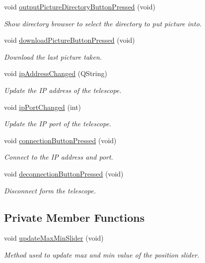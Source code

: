 \begin{DoxyCompactItemize}
void \mbox{\hyperlink{class_autoscope_window_form_a429d5bdc1f4d7d673e5ae85692e2b67f}{output\+Picture\+Directory\+Button\+Pressed}} (void)
\begin{DoxyCompactList}\small\item\em Show directory browser to select the directory to put picture into. \end{DoxyCompactList}\item 
void \mbox{\hyperlink{class_autoscope_window_form_aa9b74f8e713325bc6a1ffbfa2bde4c86}{download\+Picture\+Button\+Pressed}} (void)
\begin{DoxyCompactList}\small\item\em Download the last picture taken. \end{DoxyCompactList}\item 
void \mbox{\hyperlink{class_autoscope_window_form_a80f7209d6d50544e0ff3428929144ab9}{ip\+Address\+Changed}} (Q\+String)
\begin{DoxyCompactList}\small\item\em Update the IP address of the telescope. \end{DoxyCompactList}\item 
void \mbox{\hyperlink{class_autoscope_window_form_a6a97495bdd5b32ffb89c8c282873e214}{ip\+Port\+Changed}} (int)
\begin{DoxyCompactList}\small\item\em Update the IP port of the telescope. \end{DoxyCompactList}\item 
void \mbox{\hyperlink{class_autoscope_window_form_a1ff4464df3990dc363cb186813427a0d}{connection\+Button\+Pressed}} (void)
\begin{DoxyCompactList}\small\item\em Connect to the IP address and port. \end{DoxyCompactList}\item 
void \mbox{\hyperlink{class_autoscope_window_form_ab370615515fd07540aed9fa2afa06522}{deconnection\+Button\+Pressed}} (void)
\begin{DoxyCompactList}\small\item\em Disconnect form the telescope. \end{DoxyCompactList}\end{DoxyCompactItemize}
\subsection*{Private Member Functions}
\begin{DoxyCompactItemize}
\item 
void \mbox{\hyperlink{class_autoscope_window_form_a599b2ec55d4051832dea26cc715265fe}{update\+Max\+Min\+Slider}} (void)
\begin{DoxyCompactList}\small\item\em Method used to update max and min value of the position slider. \end{DoxyCompactList}\end{DoxyCompactItemize}
